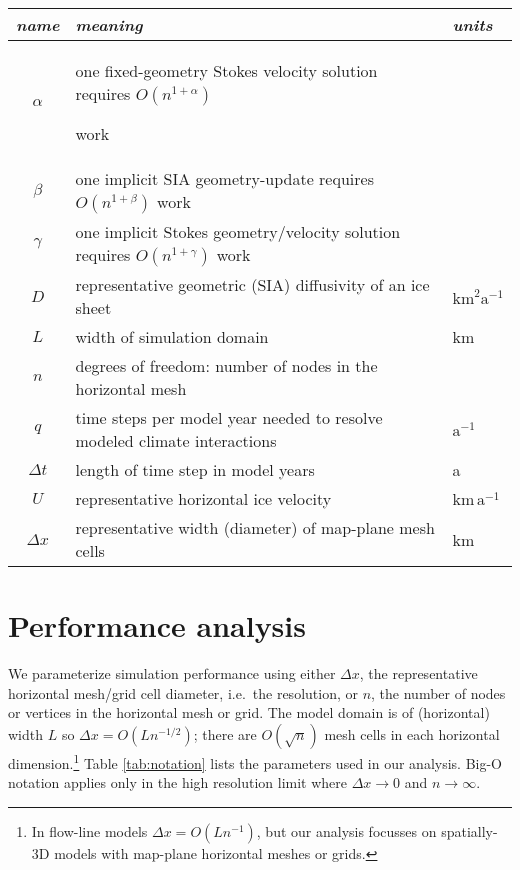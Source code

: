\documentclass[twocolumn,letterpaper]{igs}
\begin{document}
\begin{table*}[ht]
{\normalsize
\begin{tabular}{cll}
\emph{name} & \emph{meaning} & \emph{units} \\ \hline
$\alpha$    & one fixed-geometry Stokes velocity solution requires $O(n^{1+\alpha})${\large \strut} work\\
$\beta$     & one implicit SIA geometry-update requires $O(n^{1+\beta})$ work \\
$\gamma$    & one implicit Stokes geometry/velocity solution requires $O(n^{1+\gamma})$ work \\
$D$         & representative geometric (SIA) diffusivity of an ice sheet & $\text{km}^2 \text{a}^{-1}$ \\
$L$         & width of simulation domain & km \\
$n$         & degrees of freedom: number of nodes in the horizontal mesh \\
$q$         & time steps per model year needed to resolve modeled climate interactions & $\text{a}^{-1}$ \\
$\Delta t$  & length of time step in model years & a \\
$U$         & representative horizontal ice velocity & $\text{km}\,\text{a}^{-1}$ \\
$\Delta x$  & representative width (diameter) of map-plane mesh cells & km
\end{tabular}
}
\caption{Parameters for performance analysis; $\alpha,\beta,\gamma,n$ are pure numbers.}
\label{tab:notation}
\end{table*}


\section{Performance analysis}

We parameterize simulation performance using either $\Delta x$, the representative horizontal mesh/grid cell diameter, i.e.~the resolution, or $n$, the number of nodes or vertices in the horizontal mesh or grid.  The model domain is of (horizontal) width $L$ so $\Delta x = O(L n^{-1/2})$; there are $O(\sqrt{n})$ mesh cells in each horizontal dimension.\footnote{In flow-line models $\Delta x = O(L n^{-1})$, but our analysis focusses on spatially-3D models with map-plane horizontal meshes or grids.}  Table \ref{tab:notation} lists the parameters used in our analysis.  Big-O notation applies only in the high resolution limit where $\Delta x \to 0$ and $n\to \infty$.  
\end{document}
